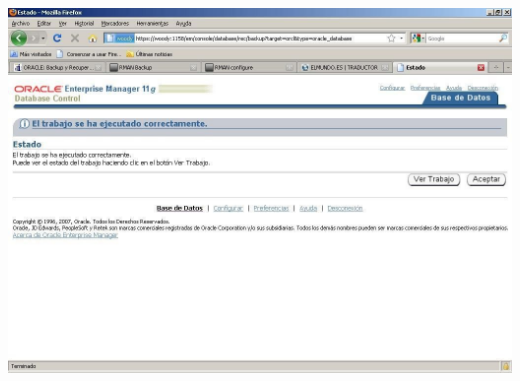\begin{enumerate}[1.]
	\begin{center}
	\includegraphics[width=15cm]{./Imagenes/img-4-2-7}  
	\end{center}






\end{enumerate}
